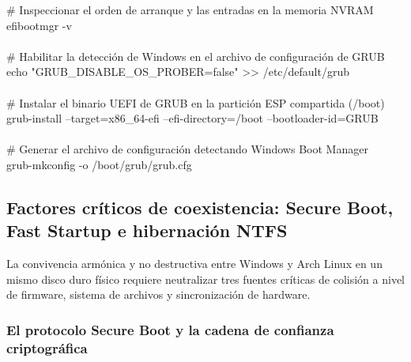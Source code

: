 \documentclass[12pt]{article}
\begin{document}
\begin{mdframed}[style=terminal]
\ttfamily\upshape\color{bashLetterColor}\footnotesize
\# Inspeccionar el orden de arranque y las entradas en la memoria NVRAM \\
efibootmgr -v \\
\\
\# Habilitar la detección de Windows en el archivo de configuración de GRUB \\
echo "GRUB\_DISABLE\_OS\_PROBER=false" >> /etc/default/grub \\
\\
\# Instalar el binario UEFI de GRUB en la partición ESP compartida (/boot) \\
grub-install --target=x86\_64-efi --efi-directory=/boot --bootloader-id=GRUB \\
\\
\# Generar el archivo de configuración detectando Windows Boot Manager \\
grub-mkconfig -o /boot/grub/grub.cfg
\end{mdframed}

\subsection{Factores críticos de coexistencia: Secure Boot, Fast Startup e hibernación NTFS}
\label{sec:factoresCriticosCoexistencia}

La convivencia armónica y no destructiva entre Windows y Arch Linux en un mismo disco duro físico requiere neutralizar tres fuentes críticas de colisión a nivel de firmware, sistema de archivos y sincronización de hardware.

\subsubsection{El protocolo Secure Boot y la cadena de confianza criptográfica}
\end{document}
